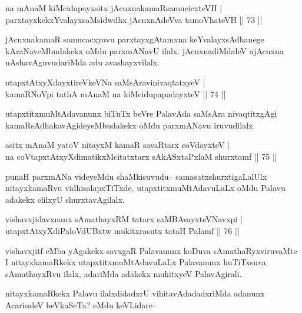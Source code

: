 \begin{shl}
na mAnaM kiMcidapayxsitx jAcnxnakamaRsamucicxteVH |\\
parxtayxkekxYvalayxsaMsidwdhx jAcnxnAdeVva tamoVhateVH \hfill || 73 ||
\end{shl}

\begin{artha}
jAcnxnakamaR samucacxyavu parxtayxgAtamxna keYvalayxsAdhanege kAraNaveMbudakekx oMdu parxmANavU ilalx. jAcnxnadiMdaleV ajAcnxna nAshavAguvudariMda adu avashayxvilalx.
\end{artha}

\begin{shl}
utapxtAtxyXdayxtireVkeVNa saMsAravinivaqtatxyeV |\\
kamaRNoV\s pi tathA mAnaM na kiMcidupapadayxteV \hfill || 74 ||
\end{shl}

\begin{artha}
utapxtitxmuMtAdavanunx biTuTx beVre PalavAda saMsAra nivaqtitxgAgi kamaRsAdhakavAgideyeMbudakekx oMdu parxmANavu iruvudilalx.
\end{artha}


\begin{shl}
asitx mAnaM yatoV nitayxM kamaR savaRtarx coVdayxteV |\\
na coVtapxtAtxyXdimatikxMcitatxtarx sAkASxtaPxlaM shurxtamf \hfill || 75 ||
\end{shl}

\begin{artha}
punaH parxmANa videyeMdu shaMkisuvudu-- samasatxshurxtigaLalUlx nitayxkamaRvu vidhisalapxTiTxde. utapxtitxmuMtAdavuLaLx oMdu Palavu adakekx elilxyU shurxtavAgilalx.
\end{artha}

\begin{shl}
vishavxjidavxnanx sAmathayxRM tatarx saMBAvayxteV\s Navxpi |\\
utapxtAtxyXdiPaloVdUBxtw mukitxrasutx tataH Palamf \hfill || 76 ||
\end{shl}

\begin{artha}
vishavxjitf eMba yAgakekx savxgaR Palavanunx koDuva sAmathaRyxviruvaMte I nitayxkamaRkekx utapxtitxmuMtAdavuLaLx Palavanunx huTiTxsuva sAmathayxRvu ilalx, adariMda adakekx mukitxyeV PalavAgirali.
\end{artha}

\begin{artha}
nitayxkamaRkekx Palavu ilalxdidadxrU vihitavAdadadxriMda adanunx AcarisaleV beVkaSeTx? eMdu keVLidare--
\end{artha}

